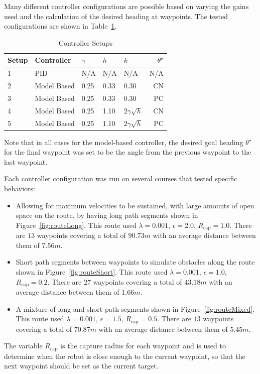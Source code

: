 Many different controller configurations are possible based on varying the gains used and the calculation of the desired heading at waypoints. The tested configurations are shown in Table~\ref{tab:resultsControllersSetup}.

\begin{table}[ht!]
\caption{Controller Setups}
\small
\centering
\begin{tabular}{@{}lllllr@{}} \toprule
Setup & Controller  & $\gamma$ & $h$  & $k$               & $\theta^\star$ \\ \midrule
1     & PID         & N/A      & N/A  & N/A               & N/A \\
2     & Model Based & 0.25     & 0.33 & 0.30              & CN \\
3     & Model Based & 0.25     & 0.33 & 0.30              & PC \\
4     & Model Based & 0.25     & 1.10 & $2\gamma\sqrt{h}$ & CN \\
5     & Model Based & 0.25     & 1.10 & $2\gamma\sqrt{h}$ & PC \\ \bottomrule
\end{tabular}
\label{tab:resultsControllersSetup}
\end{table}

Note that in all cases for the model-based controller, the desired goal heading $\theta^\star$ for the final waypoint was set to be the angle from the previous waypoint to the last waypoint.

Each controller configuration was run on several courses that tested specific behaviors:
\begin{itemize}
\item Allowing for maximum velocities to be sustained, with large amounts of open space on the route, by having long path segments shown in Figure~\ref{fig:routeLong}. This route used $\lambda = 0.001$, $\epsilon = 2.0$, $R_{\text{cap}} = 1.0$. There are $13$ waypoints covering a total of $90.73 m$ with an average distance between them of $7.56 m$.
\item Short path segments between waypoints to simulate obstacles along the route shown in Figure~\ref{fig:routeShort}. This route used $\lambda = 0.001$, $\epsilon = 1.0$, $R_{\text{cap}} = 0.2$. There are $27$ waypoints covering a total of $43.18 m$ with an average distance between them of $1.66 m$.
\item A mixture of long and short path segments shown in Figure~\ref{fig:routeMixed}. This route used $\lambda = 0.001$, $\epsilon = 1.5$, $R_{\text{cap}} = 0.5$. There are $13$ waypoints covering a total of $70.87 m$ with an average distance between them of $5.45 m$.
\end{itemize}
The variable $R_{\text{cap}}$ is the capture radius for each waypoint and is used to determine when the robot is close enough to the current waypoint, so that the next waypoint should be set as the current target.


